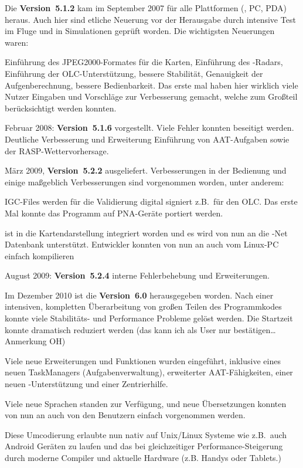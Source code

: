 Die {\bf Version~5.1.2} kam im September 2007 für alle Plattformen (\xc, PC, PDA) heraus.
Auch hier sind etliche Neuerung vor der Herausgabe  durch intensive Test im Fluge und in Simulationen geprüft worden.
Die wichtigsten Neuerungen waren: 

Einführung des JPEG2000-Formates für die Karten, Einführung des \fl-Radars, Einführung der
OLC-Unterstützung, bessere Stabilität, Genauigkeit der Aufgenberechnung, bessere Bedienbarkeit.
Das erste mal haben hier wirklich viele Nutzer Eingaben und Vorschläge zur Verbesserung gemacht,
welche  zum Großteil berücksichtigt werden konnten.

Februar 2008:  {\bf Version~5.1.6} vorgestellt. Viele Fehler konnten beseitigt werden. Deutliche Verbesserung und
Erweiterung Einführung von AAT-Aufgaben sowie der RASP-Wettervorhersage.

März 2009, {\bf Version~5.2.2} ausgeliefert. Verbesserungen in der Bedienung und einige maßgeblich Verbesserungen sind
vorgenommen worden, unter anderem:

IGC-Files werden für die Validierung digital signiert z.B.\ für den OLC. Das erste Mal konnte das Programm auf
PNA-Geräte portiert werden.

\fl ist in die Kartendarstellung integriert worden und es wird von nun an die \fl-Net Datenbank unterstützt.
Entwickler konnten von nun an \xc auch vom Linux-PC einfach kompilieren

August  2009: {\bf Version~5.2.4} interne Fehlerbehebung und Erweiterungen.

Im Dezember 2010 ist die {\bf Version~6.0} herausgegeben worden.
Nach einer intensiven, kompletten  Überarbeitung von großen Teilen des Programmkodes konnte viele Stabilitäts- und Performance
Probleme gelöst werden. Die Startzeit konnte dramatisch reduziert werden {(\small das kann ich als User nur bestätigen\dots Anmerkung OH)}

Viele neue Erweiterungen und Funktionen wurden eingeführt, inklusive eines neuen TaskManagers (Aufgabenverwaltung), 
erweiterter AAT-Fähigkeiten, einer neuen \fl-Unterstützung und einer Zentrierhilfe. 

Viele neue Sprachen standen zur Verfügung, und neue Übersetzungen konnten von nun an auch von
den Benutzern einfach vorgenommen werden.

Diese Umcodierung erlaubte \xc nun nativ auf Unix/Linux Systeme wie z.B.\ auch Android Geräten zu laufen
und das bei gleichzeitiger Performance-Steigerung durch moderne Compiler und aktuelle Hardware (z.B. Handys oder Tablets.)

